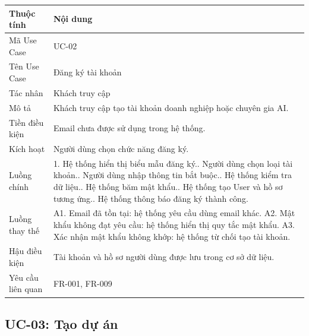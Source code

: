 \begin{longtable}{|p{3.5cm}|p{10.2cm}|}
\hline
\textbf{Thuộc tính} & \textbf{Nội dung} \\ \hline
Mã Use Case & UC-02 \\ \hline
Tên Use Case & Đăng ký tài khoản \\ \hline
Tác nhân & Khách truy cập \\ \hline
Mô tả & Khách truy cập tạo tài khoản doanh nghiệp hoặc chuyên gia AI. \\ \hline
Tiền điều kiện & Email chưa được sử dụng trong hệ thống. \\ \hline
Kích hoạt & Người dùng chọn chức năng đăng ký. \\ \hline
Luồng chính &
1. Hệ thống hiển thị biểu mẫu đăng ký.\newline
2. Người dùng chọn loại tài khoản.\newline
3. Người dùng nhập thông tin bắt buộc.\newline
4. Hệ thống kiểm tra dữ liệu.\newline
5. Hệ thống băm mật khẩu.\newline
6. Hệ thống tạo User và hồ sơ tương ứng.\newline
7. Hệ thống thông báo đăng ký thành công. \\ \hline
Luồng thay thế &
A1. Email đã tồn tại: hệ thống yêu cầu dùng email khác.\newline
A2. Mật khẩu không đạt yêu cầu: hệ thống hiển thị quy tắc mật khẩu.\newline
A3. Xác nhận mật khẩu không khớp: hệ thống từ chối tạo tài khoản. \\ \hline
Hậu điều kiện & Tài khoản và hồ sơ người dùng được lưu trong cơ sở dữ liệu. \\ \hline
Yêu cầu liên quan & FR-001, FR-009 \\ \hline
\end{longtable}

\subsection{UC-03: Tạo dự án}

